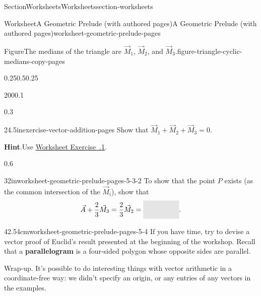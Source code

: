 \documentclass[oneside,10pt,]{article}
\newcommand{\blocktitlefont}{\relax}
\newcommand{\xreffont}{\relax}
\newcommand{\ptxterminology}[1]{\textbf{#1}}
\newcommand{\fillinmath}[1]{\mathchoice{\colorbox{fillinmathshade}{$\displaystyle     \phantom{\,#1\,}$}}{\colorbox{fillinmathshade}{$\textstyle        \phantom{\,#1\,}$}}{\colorbox{fillinmathshade}{$\scriptstyle      \phantom{\,#1\,}$}}{\colorbox{fillinmathshade}{$\scriptscriptstyle\phantom{\,#1\,}$}}}
\numberwithin{equation}{section}
\begin{document}
\begin{sectionptx}{Section}{Worksheets}{}{Worksheets}{}{}{section-worksheets}
\begin{worksheet-subsection}{Worksheet}{A Geometric Prelude (with authored pages)}{}{A Geometric Prelude (with authored pages)}{}{}{worksheet-geometric-prelude-pages}
\begin{figureptx}{Figure}{The medians of the triangle are \(\vec{M}_1\), \(\vec{M}_2\), and \(\vec{M}_3\).}{figure-triangle-cyclic-medians-copy-pages}{}
\begin{image}{0.25}{0.5}{0.25}{}
{%
}%
\end{image}%
\tcblower
\end{figureptx}%
\begin{sidebyside}{2}{0}{0}{0.1}%
\begin{sbspanel}{0.3}%
\begin{divisionexercise}{2}{}{4.5in}{exercise-vector-addition-pages}%
Show that \(\vec{M}_{1} + \vec{M}_{2} + \vec{M}_{3} = 0\).%
\par\smallskip%
\noindent\textbf{\blocktitlefont Hint}.\hypertarget{exercise-vector-addition-pages-2}{}\quad{}Use \hyperlink{ex-cyclic}{Worksheet Exercise~{\xreffont 1.1.1}}.%
\end{divisionexercise}%
\end{sbspanel}%
\begin{sbspanel}{0.6}%
\begin{divisionexercise}{3}{}{2in}{worksheet-geometric-prelude-pages-5-3-2}%
To show that the point \(P\) exists (as the common intersection of the \(\vec{M}_{i}\)), show that%
\begin{equation*}
\vec{A} + \frac{2}{3} \vec{M}_{3} = \frac{2}{3} \vec{M}_{2} = \fillinmath{\frac{2}{3} \vec{M}_{1}-\vec{C}}\text{.}
\end{equation*}
%
\end{divisionexercise}%
\end{sbspanel}%
\end{sidebyside}%
\begin{divisionexercise}{4}{}{2.54cm}{worksheet-geometric-prelude-pages-5-4}%
If you have time, try to devise a vector proof of Euclid's result presented at the beginning of the workshop. Recall that a \ptxterminology{parallelogram} is a four-sided polygon whose opposite sides are parallel.%
\end{divisionexercise}%
\begin{conclusion}{Wrap-up.}%
It's possible to do interesting things with vector arithmetic in a coordinate-free way: we didn't specify an origin, or any entries of any vectors in the examples.%
\end{conclusion}%
\end{worksheet-subsection}
\restoregeometry
%
%
\typeout{************************************************}
\typeout{************************************************}
%

\end{sectionptx}
\end{document}
